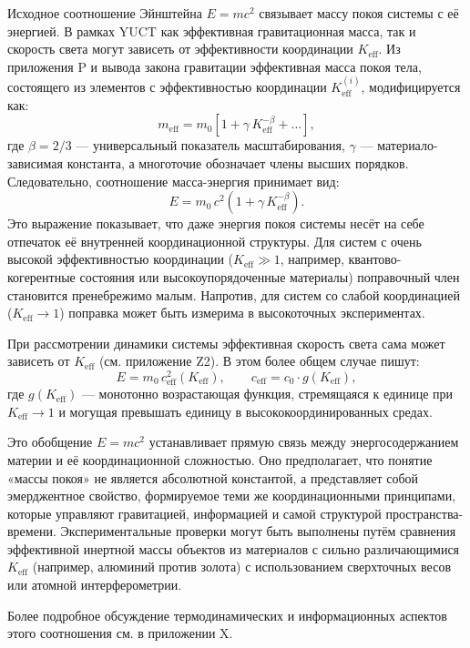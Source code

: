 \documentclass[12pt]{article}
\theoremstyle{remark}
\begin{document}
	Исходное соотношение Эйнштейна $E = m c^{2}$ связывает массу покоя системы с её энергией. В рамках YUCT как эффективная гравитационная масса, так и скорость света могут зависеть от эффективности координации $K_{\mathrm{eff}}$. Из приложения P и вывода закона гравитации эффективная масса покоя тела, состоящего из элементов с эффективностью координации $K_{\mathrm{eff}}^{(i)}$, модифицируется как:
	\[
	m_{\mathrm{eff}} = m_{0} \left[ 1 + \gamma \, K_{\mathrm{eff}}^{-\beta} + \dots \right],
	\]
	где $\beta = 2/3$ — универсальный показатель масштабирования, $\gamma$ — материало-зависимая константа, а многоточие обозначает члены высших порядков. Следовательно, соотношение масса-энергия принимает вид:
	\[
	\boxed{E = m_{0} \, c^{2} \left( 1 + \gamma \, K_{\mathrm{eff}}^{-\beta} \right)}.
	\]
	Это выражение показывает, что даже энергия покоя системы несёт на себе отпечаток её внутренней координационной структуры. Для систем с очень высокой эффективностью координации ($K_{\mathrm{eff}} \gg 1$, например, квантово-когерентные состояния или высокоупорядоченные материалы) поправочный член становится пренебрежимо малым. Напротив, для систем со слабой координацией ($K_{\mathrm{eff}} \to 1$) поправка может быть измерима в высокоточных экспериментах.
	
	При рассмотрении динамики системы эффективная скорость света сама может зависеть от $K_{\mathrm{eff}}$ (см. приложение Z2). В этом более общем случае пишут:
	\[
	E = m_{0} \, c_{\mathrm{eff}}^{2}(K_{\mathrm{eff}}),\qquad
	c_{\mathrm{eff}} = c_{0} \cdot g(K_{\mathrm{eff}}),
	\]
	где $g(K_{\mathrm{eff}})$ — монотонно возрастающая функция, стремящаяся к единице при $K_{\mathrm{eff}} \to 1$ и могущая превышать единицу в высококоординированных средах.
	
	Это обобщение $E = mc^{2}$ устанавливает прямую связь между энергосодержанием материи и её координационной сложностью. Оно предполагает, что понятие «массы покоя» не является абсолютной константой, а представляет собой эмерджентное свойство, формируемое теми же координационными принципами, которые управляют гравитацией, информацией и самой структурой пространства-времени. Экспериментальные проверки могут быть выполнены путём сравнения эффективной инертной массы объектов из материалов с сильно различающимися $K_{\mathrm{eff}}$ (например, алюминий против золота) с использованием сверхточных весов или атомной интерферометрии.
	
	Более подробное обсуждение термодинамических и информационных аспектов этого соотношения см. в приложении X.
	
\end{document}
